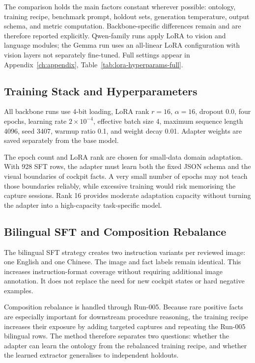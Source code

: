 The comparison holds the main factors constant wherever possible: ontology,
training recipe, benchmark prompt, holdout sets, generation temperature, output
schema, and metric computation. Backbone-specific differences remain and are
therefore reported explicitly. Qwen-family runs apply LoRA to vision and
language modules; the Gemma run uses an all-linear LoRA configuration with
vision layers not separately fine-tuned. Full settings appear in
Appendix~\ref{ch:appendix}, Table~\ref{tab:lora-hyperparams-full}.

\subsection{Training Stack and Hyperparameters}

All backbone runs use 4-bit loading, LoRA rank $r=16$, $\alpha=16$, dropout
$0.0$, four epochs, learning rate $2 \times 10^{-4}$, effective batch size 4,
maximum sequence length 4096, seed 3407, warmup ratio 0.1, and weight decay
0.01. Adapter weights are saved separately from the base model.

The epoch count and LoRA rank are chosen for small-data domain adaptation.
With 928 SFT rows, the adapter must learn both the fixed JSON schema and the
visual boundaries of cockpit facts. A very small number of epochs may not teach
those boundaries reliably, while excessive training would risk memorising the
capture sessions. Rank 16 provides moderate adaptation capacity without turning
the adapter into a high-capacity task-specific model.

\subsection{Bilingual SFT and Composition Rebalance}

The bilingual SFT strategy creates two instruction variants per reviewed image:
one English and one Chinese. The image and fact labels remain identical. This
increases instruction-format coverage without requiring additional image
annotation. It does not replace the need for new cockpit states or hard
negative examples.

Composition rebalance is handled through Run-005. Because rare positive facts
are especially important for downstream procedure reasoning, the training
recipe increases their exposure by adding targeted captures and repeating the
Run-005 bilingual rows. The method therefore separates two questions: whether
the adapter can learn the ontology from the rebalanced training recipe, and
whether the learned extractor generalises to independent holdouts.

